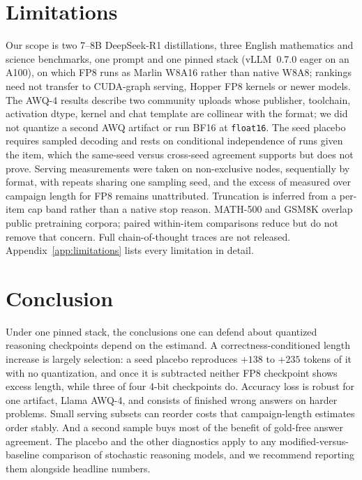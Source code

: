 \documentclass[11pt,a4paper]{article}
\begin{document}
\section{Limitations}
\label{sec:limitations}
Our scope is two 7--8B DeepSeek-R1 distillations, three English mathematics and science benchmarks, one prompt and one pinned stack (vLLM~0.7.0 eager on an A100), on which FP8 runs as Marlin W8A16 rather than native W8A8; rankings need not transfer to CUDA-graph serving, Hopper FP8 kernels or newer models. The AWQ-4 results describe two community uploads whose publisher, toolchain, activation dtype, kernel and chat template are collinear with the format; we did not quantize a second AWQ artifact or run BF16 at \texttt{float16}. The seed placebo requires sampled decoding and rests on conditional independence of runs given the item, which the same-seed versus cross-seed agreement supports but does not prove. Serving measurements were taken on non-exclusive nodes, sequentially by format, with repeats sharing one sampling seed, and the excess of measured over campaign length for FP8 remains unattributed. Truncation is inferred from a per-item cap band rather than a native stop reason. MATH-500 and GSM8K overlap public pretraining corpora; paired within-item comparisons reduce but do not remove that concern. Full chain-of-thought traces are not released. Appendix~\ref{app:limitations} lists every limitation in detail.

\section{Conclusion}
\label{sec:conclusion}
Under one pinned stack, the conclusions one can defend about quantized reasoning checkpoints depend on the estimand. A correctness-conditioned length increase is largely selection: a seed placebo reproduces $+138$ to $+235$ tokens of it with no quantization, and once it is subtracted neither FP8 checkpoint shows excess length, while three of four 4-bit checkpoints do. Accuracy loss is robust for one artifact, Llama AWQ-4, and consists of finished wrong answers on harder problems. Small serving subsets can reorder costs that campaign-length estimates order stably. And a second sample buys most of the benefit of gold-free answer agreement. The placebo and the other diagnostics apply to any modified-versus-baseline comparison of stochastic reasoning models, and we recommend reporting them alongside headline numbers.
\end{document}
